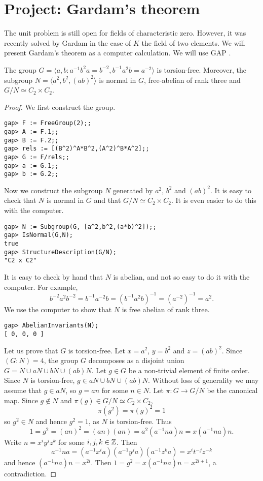 \section*{Project: Gardam's theorem}
\label{section:Gardam}

The unit problem is still open for fields of characteristic zero. 
However, it was recently solved by Gardam \cite{MR4334981} 
in the case of 
$K$ the field of two elements. We will present Gardam's theorem 
as a computer calculation. We will use \textsf{GAP} \cite{GAP4}.  

\begin{lemma}
    The group $G=\langle a,b:a^{-1}b^2a=b^{-2},b^{-1}a^2b=a^{-2}\rangle$
    is torsion-free. Moreover, the subgroup $N=\langle a^2,b^2,(ab)^2\rangle$ is normal in $G$, 
    free-abelian of rank three and $G/N\simeq C_2\times C_2$.
\end{lemma}

\begin{proof}
    We first construct the group.
\begin{lstlisting}
gap> F := FreeGroup(2);;
gap> A := F.1;;
gap> B := F.2;;
gap> rels := [(B^2)^A*B^2,(A^2)^B*A^2];;
gap> G := F/rels;;
gap> a := G.1;;
gap> b := G.2;;
\end{lstlisting}
    Now we construct the subgroup $N$ generated by $a^2$, $b^2$ and $(ab)^2$. 
    It is easy to check that $N$ is normal 
    in $G$ and that $G/N\simeq C_2\times C_2$. It is even easier 
    to do this with the computer.
\begin{lstlisting}
gap> N := Subgroup(G, [a^2,b^2,(a*b)^2]);;
gap> IsNormal(G,N);
true
gap> StructureDescription(G/N);
"C2 x C2"
\end{lstlisting}
    It is easy to check by hand that $N$ is abelian, and not so easy to do it with
    the computer. For example, 
    \[
    b^{-2}a^2b^{-2}=b^{-1}a^{-2}b=(b^{-1}a^2b)^{-1}=(a^{-2})^{-1}=a^2.
    \]
    We use the computer to show that
    $N$ is free abelian of rank three. 
\begin{lstlisting}
gap> AbelianInvariants(N);
[ 0, 0, 0 ]
\end{lstlisting}

    Let us prove that $G$ is torsion-free. Let 
    $x=a^2$, $y=b^2$ and $z=(ab)^2$. 
    Since $(G:N)=4$, the group $G$ decomposes as a disjoint union
    $G=N\cup aN\cup bN\cup (ab)N$. Let $g\in G$ be a non-trivial element of finite order. 
    Since $N$ is torsion-free, $g\in aN\cup bN\cup (ab)N$. Without loss of generality 
    we may assume that $g\in aN$, so $g=an$ for some $n\in N$. 
    Let $\pi\colon G\to G/N$ be the canonical map. 
    Since $g\not\in N$ and $\pi(g)\in G/N\simeq C_2\times C_2$, 
    \[
    \pi(g^2)=\pi(g)^2=1
    \]
    so $g^2\in N$ and hence $g^2=1$, as $N$ is torsion-free.  Thus
    \[
    1=g^2=(an)^2=(an)(an)=a^2(a^{-1}na)n=x(a^{-1}na)n.
    \]
    Write $n=x^iy^jz^k$ for some $i,j,k\in\mathbb{Z}$. Then
    \[
    a^{-1}na=(a^{-1}x^ia)(a^{-1}y^ja)(a^{-1}z^ka)=x^it^{-j}z^{-k}
    \]
    and hence $(a^{-1}na)n=x^{2i}$. Then 
    $1=g^2=x(a^{-1}na)n=x^{2i+1}$, a contradiction. 
\end{proof}


